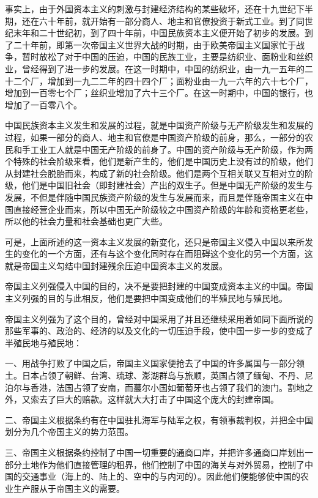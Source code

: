 事实上，由于外国资本主义的刺激与封建经济结构的某些破坏，还在十九世纪下半期，还在六十年前，就开始有一部分商人、地主和官僚投资于新式工业。到了同世纪末年和二十世纪初，到了四十年前，中国民族资本主义便开始了初步的发展。到了二十年前，即第一次帝国主义世界大战的时期，由于欧美帝国主义国家忙于战争，暂时放松了对于中国的压迫，中国的民族工业，主要是纺织业、面粉业和丝织业，曾经得到了进一步的发展。在这一时期中，中国的纺织业，由一九一五年的二十二个厂，增加到一九二二年的四十四个厂；面粉业由一九一六年的六十七个厂，增加到一百零七个厂；丝织业增加了六十三个厂。在这一时期中，中国的银行，也增加了一百零八个。

中国民族资本主义发生和发展的过程，就是中国资产阶级与无产阶级发生和发展的过程，如果一部分的商人、地主和官僚是中国资产阶级的前身，那么，一部分的农民和手工业工人就是中国无产阶级的前身了。中国的资产阶级与无产阶级，作为两个特殊的社会阶级来看，他们是新产生的，他们是中国历史上没有过的阶级，他们从封建社会脱胎而来，构成了新的社会阶级。他们是两个互相关联又互相对立的阶级，他们是中国旧社会（即封建社会）产出的双生子。但是中国无产阶级的发生与发展，不但是伴随中国民族资产阶级的发生与发展而来，而且是伴随帝国主义在中国直接经营企业而来，所以中国无产阶级较之中国资产阶级的年龄和资格更老些，所以他的社会力量和社会基础也更广大些。

可是，上面所述的这一资本主义发展的新变化，还只是帝国主义侵入中国以来所发生的变化的一个方面，还有与这个变化同时存在而阻碍这个变化的另一个方面，这就是帝国主义勾结中国封建残余压迫中国资本主义的发展。

帝国主义列强侵入中国的目的，决不是要把封建的中国变成资本主义的中国。帝国主义列强的目的与此相反，他们是要把中国变成他们的半殖民地与殖民地。

帝国主义列强为了这个目的，曾经对中国采用了并且还继续采用着如同下面所说的那些军事的、政治的、经济的以及文化的一切压迫手段，使中国一步一步的变成了半殖民地与殖民地：

一、用战争打败了中国之后，帝国主义国家便抢去了中国的许多属国与一部分领土。日本占领了朝鲜、台湾、琉球、澎湖群岛与旅顺，英国占领了缅甸、不丹、尼泊尔与香港，法国占领了安南，而蕞尔小国如葡萄牙也占领了我们的澳门。割地之外，又索去了巨大的赔款。这样就大大打击了中国这个庞大的封建帝国。

二、帝国主义根据条约有在中国驻扎海军与陆军之权，有领事裁判权，并把全中国划分为几个帝国主义的势力范围。

三、帝国主义根据条约控制了中国一切重要的通商口岸，并把许多通商口岸划出一部分土地作为他们直接管理的租界，他们控制了中国的海关与对外贸易，控制了中国的交通事业（海上的、陆上的、空中的与内河的）。因此他们便能够使中国的农业生产服从于帝国主义的需要。

